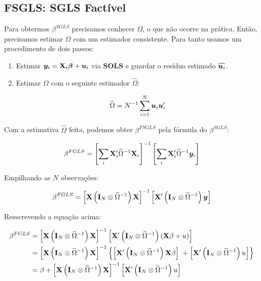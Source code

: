 \documentclass[11pt, oneside, a4paper, article]{article}
\numberwithin{equation}{section}
\begin{document}
\begin{description}
\subsection{FSGLS: SGLS Factível}

Para obtermos $\beta^{SGLS}$ precisamos conhecer $\Omega$, o que não ocorre na prática.
Então, precisamos estimar $\Omega$ com um estimador consistente.
Para tanto usamos um procedimento de dois passos:

\begin{enumerate}
\item  %
Estimar $\boldsymbol{y}_{i} = \mathbf{X}_{i} \boldsymbol{\beta} + \boldsymbol{u}_{i}$ via \textbf{SOLS} e guardar o resíduo estimado $\widehat{\boldsymbol{u}_{i}}$.

\item  %
Estimar $\Omega$ com o seguinte estimador $\widehat{\Omega}$:

\vspace{-1.5 em}
\begin{align*}
	\widehat{\Omega} 
	= 
	N^{-1} \sum_{i=1}^{N} \boldsymbol{u}_{i} \boldsymbol{u}_{i}'
\end{align*}
\end{enumerate}

Com a estimativa $\widehat{\Omega}$ feita, podemos obter $\beta^{FSGLS}$ pela fórmula do $\beta^{SGLS}$:

\vspace{-1.5 em}
\begin{align*}
	\beta^{FGLS}
	= 
	\left[ 
		\sum_{i} \mathbf{X}_{i}' \widehat{\Omega}^{-1} \mathbf{X}_{i}
	\right]^{-1}
	\left[ 
		\sum_{i} \mathbf{X}_{i}' \widehat{\Omega}^{-1} \boldsymbol{y}_{i}
	\right]
\end{align*}

Empilhando as $N$ observações:

\vspace{-1.5 em}
\begin{align*}
\beta^{FGLS}
= 
\left[ \mathbf{X} \left( \mathbf{I}_{N} \otimes \widehat{\Omega}^{-1} \right) \mathbf{X} \right]^{-1}
\left[ \mathbf{X}' \left( \mathbf{I}_{N} \otimes \widehat{\Omega}^{-1} \right) \boldsymbol{y} \right]
\end{align*}

Reescrevendo a equação acima:

\vspace{-1.5 em}
\begin{align*}
\beta^{FGLS}
&= 
\left[  \mathbf{X} \left( \mathbf{I}_{N} \otimes \widehat{\Omega}^{-1} \right) \mathbf{X} \right]^{-1}
\left[  \mathbf{X}' \left( \mathbf{I}_{N} \otimes \widehat{\Omega}^{-1} \right) (\mathbf{X} \beta + u) \right]
\\
&= 
\left[ \mathbf{X} \left( \mathbf{I}_{N} \otimes \widehat{\Omega}^{-1} \right) \mathbf{X} \right]^{-1}
\left\{ 
\left[ \mathbf{X}' \left( \mathbf{I}_{N} \otimes \widehat{\Omega}^{-1} \right) \mathbf{X} \beta \right]
\; +
\left[ \mathbf{X}' \left( \mathbf{I}_{N} \otimes \widehat{\Omega}^{-1} \right) u \right]
\right\}
\\
&= 
\beta +
\left[ \mathbf{X} \left( \mathbf{I}_{N} \otimes \widehat{\Omega}^{-1} \right) \mathbf{X} \right]^{-1}
\left[ \mathbf{X}' \left( \mathbf{I}_{N} \otimes \widehat{\Omega}^{-1} \right) u \right]
\end{align*}


\end{description}
\end{document}
